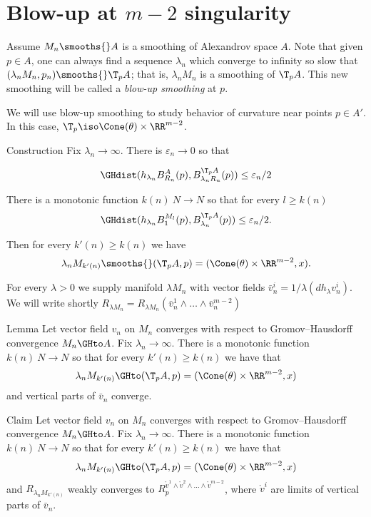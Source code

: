 

\section{Blow-up at $m-2$ singularity}\label{sec:blow}

Assume $M_n\smooths{} A$ is a smoothing of Alexandrov space $A$.
Note that given $p\in A$,
one can always find a sequence $\lambda_n$
which converge to infinity so slow that
$(\lambda_n M_n,p_n)\smooths{} \T_p A$;
that is, $\lambda_n M_n$ is a smoothing of $\T_pA$.
This new smoothing will be called a \emph{blow-up smoothing} at $p$.

We will use blow-up smoothing to study behavior of curvature near points $p\in A'$.
In this case, $\T_p\iso\Cone(\theta)\times \RR^{m-2}$.






\begin{thm}{Construction}\label{constr}
Fix $\lambda_n\to\infty$. There is $\varepsilon_n\to 0$ so that

$$\GHdist(h_{\lambda_n}B^A_{R_n}(p), B^{\T_p A}_{\lambda_n R_n}(p))\le\varepsilon_n/2$$

There is a monotonic function
 $k(n)\:N\to N$
so that for every $l\ge k(n)$
$$\GHdist(h_{\lambda_n}B^{M_l}_{1}(p), B^{\T_p A}_{\lambda_n}(p))\le\varepsilon_n/2.$$

Then for every  $k'(n)\ge k(n)$ we have
$$\lambda_n M_{k'(n)}\smooths{} (\T_p A, p)=(\Cone(\theta)\times\RR^{m-2},x).$$
\end{thm}
For every $\lambda>0$ we supply manifold $\lambda M_n$
with vector fields
$\bar v_n^i=1/\lambda(d h_{\lambda}v_n^i)$.
We will write shortly
$R_{\lambda M_n}=R_{\lambda M_n}(\bar v_n^1\wedge\dots\wedge\bar v_n^{m-2})$

\begin{thm}{Lemma}\label{l:convVCone}
Let vector field $v_n$ on $M_n$
converges with respect to Gromov--Hausdorff
convergence $M_n\GHto A$.
Fix $\lambda_n\to\infty$.
There is a monotonic function
 $k(n)\:N\to N$ so that  for every  $k'(n)\ge k(n)$
 we have that
$$\lambda_n M_{k'(n)}\GHto (\T_p A, p)=( \Cone(\theta)\times \RR^{m-2},x)$$
and
vertical parts of $\bar v_n$ converge.
\end{thm}

\begin{thm}{Claim}\label{cl:convVCone}
Let vector field $v_n$ on $M_n$
converges with respect to Gromov--Hausdorff
convergence $M_n\GHto A$.
Fix $\lambda_n\to\infty$.
There is a monotonic function
 $k(n)\:N\to N$ so that  for every  $k'(n)\ge k(n)$
 we have that
$$\lambda_n M_{k'(n)}\GHto (\T_p A, p)=( \Cone(\theta)\times \RR^{m-2},x)$$
and
$R_{\lambda_n M_{k'(n)}}$
weakly converges to $R^{\mathring{v}^1\wedge \mathring{v}^2\wedge\dots\wedge \mathring{v}^{m-2}}_p$,
where $\mathring{v}^i$ are limits of vertical parts of $\bar v_n$.
\end{thm}


